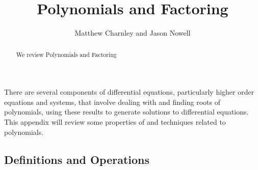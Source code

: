 \documentclass{ximera}
\title{Polynomials and Factoring}
\author{Matthew Charnley and Jason Nowell}
\begin{document}
\begin{abstract}
    We review Polynomials and Factoring
\end{abstract}
\maketitle

\label{sec:polys}


There are several components of differential equations, particularly higher order equations and systems, that involve dealing with and finding roots of polynomials, using these results to generate solutions to differential equations. This appendix will review some properties of and techniques related to polynomials. 

\subsection{Definitions and Operations}
\end{document}
